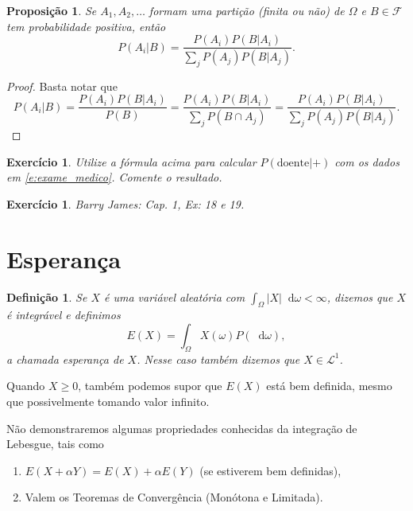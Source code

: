 \documentclass[reqno]{article}
\newcommand*\1{\mathds{1}}
\newtheorem{proposition}[theorem]{Proposição}
\newtheorem{definition}[theorem]{Definição}
\newtheorem{exercise}[example]{Exercício}
\renewcommand*\d{\mathop{}\!\mathrm{d}}
\begin{document}
\begin{proposition}
  Se $A_1, A_2, \dots$ formam uma partição (finita ou não) de $\Omega$ e $B \in \mathcal{F}$ tem probabilidade positiva, então
  \begin{equation}
    P(A_i | B) = \frac{P(A_i) P(B | A_i)}{\sum_j P(A_j) P(B | A_j)}.
  \end{equation}
\end{proposition}

\begin{proof}
  Basta notar que
  \begin{equation}
    P(A_i | B) = \frac{P(A_i) P(B | A_i)}{P(B)} = \frac{P(A_i) P(B | A_i)}{\sum_j P(B \cap A_j)} = \frac{P(A_i) P(B | A_i)}{\sum_j P(A_j) P(B | A_j)}.
  \end{equation}
\end{proof}

\begin{exercise}
  Utilize a fórmula acima para calcular $P(\text{doente} | +)$ com os dados em \eqref{e:exame_medico}.
  Comente o resultado.
\end{exercise}

\begin{exercise}
  Barry James: Cap. 1, Ex: 18 e 19.
\end{exercise}

\newpage

\section{Esperança}

\begin{definition}
  Se $X$ é uma variável aleatória com $\int_\Omega |X| \d \omega < \infty$, dizemos que $X$ é integrável e definimos
  \begin{equation}
    E(X) = \int_\Omega X(\omega) P(\d \omega),
  \end{equation}
  a chamada esperança de $X$.
  Nesse caso também dizemos que $X \in \mathcal{L}^1$.
\end{definition}

Quando $X \geq 0$, também podemos supor que $E(X)$ está bem definida, mesmo que possivelmente tomando valor infinito.

Não demonstraremos algumas propriedades conhecidas da integração de Lebesgue, tais como
\begin{enumerate}
\item $E(X + \alpha Y) = E(X) + \alpha E(Y)$ (se estiverem bem definidas),
\item Valem os Teoremas de Convergência (Monótona e Limitada).
\end{enumerate}
\end{document}
